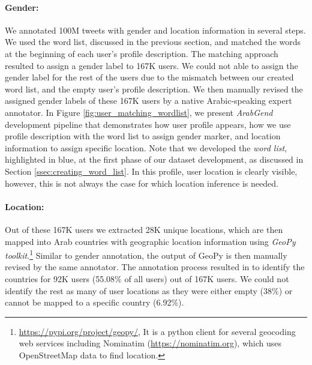 \documentclass[sigconf,authorversion,nonacm]{acmart}
\begin{document}
\paragraph{Gender:}We annotated 100M tweets with gender and location information in several steps. We used the word list, discussed in the previous section, and matched the words at the beginning of each user's profile description. The matching approach resulted to assign a gender label to 167K users. We could not able to assign the gender label for the rest of the users due to the mismatch between our created word list, and the empty user's profile description. We then manually revised the assigned gender labels of these 167K users by a native Arabic-speaking expert annotator. In Figure \ref{fig:user_matching_wordlist}, we present \textit{ArabGend} development pipeline that demonstrates how user profile appears, how we use profile description with the word list to assign gender marker, and location information to assign specific location. Note that we developed the \textit{word list}, highlighted in blue, at the first phase of our dataset development, as discussed in Section \ref{ssec:creating_word_list}. In this profile, user location is clearly visible, however, this is not always the case for which location inference is needed. 





\paragraph{Location:} Out of these 167K users we extracted 28K unique locations, which are then mapped into Arab countries with geographic location information using \textit{GeoPy toolkit}.\footnote{\url{https://pypi.org/project/geopy/}, It is a python client for several geocoding web services including Nominatim (\url{https://nominatim.org}), which uses OpenStreetMap data to find location.} Similar to gender annotation, the output of GeoPy is then manually revised by the same annotator. 
The annotation process resulted in to identify the countries for 92K users (55.08\% of all users) out of 167K users. We could not identify the rest as many of user locations as they were either empty (38\%) or cannot be mapped to a specific country (6.92\%).
\end{document}
